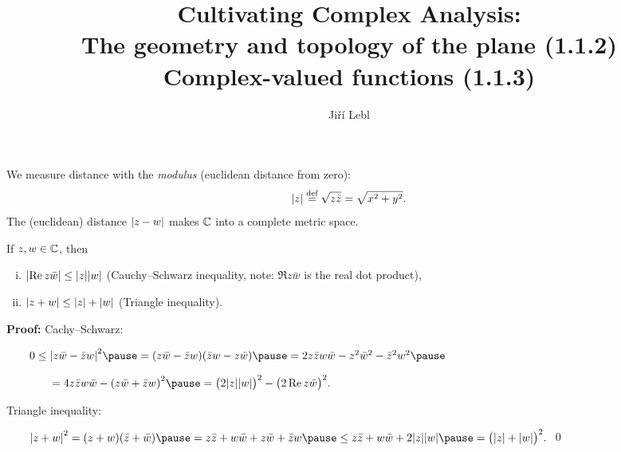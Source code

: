 \documentclass[10pt,aspectratio=169]{beamer}
\author{Ji\v{r}\'i Lebl}
\institute[OSU]{%
Departemento pri Matematiko de Oklahoma {\^S}tata Universitato}
\title{Cultivating Complex Analysis:\\%
The geometry and topology of the plane (1.1.2)\\%
Complex-valued functions (1.1.3)}
\date{}
\begin{document}
\begin{frame}
\titlepage
\end{frame}

\begin{frame}
We measure distance with the \emph{modulus} (euclidean distance from zero):
\[
\lvert {z} \rvert \overset{\text{def}}{=} \sqrt{z \bar{z}} = \sqrt{x^2+y^2} .
\]
\pause
The (euclidean) distance 
\(
\lvert {z-w} \rvert
\)
makes ${\mathbb{C}}$ into a complete metric space.

\medskip
\pause

%
%
%
%
\begin{proposition}
If $z,w \in {\mathbb{C}}$, then
\begin{enumerate}[(i)]
\item
$\lvert {\operatorname{Re}z\bar{w}} \rvert \leq \lvert {z} \rvert \lvert {w} \rvert$ \quad (Cauchy--Schwarz inequality, note: $\Re z
\bar{w}$ is the real dot product),
\item
$\lvert {z+w} \rvert \leq \lvert {z} \rvert + \lvert {w} \rvert$ \quad (Triangle inequality).
\end{enumerate}
\end{proposition}

\textbf{Proof:}
Cachy--Schwarz:

\medskip

\(
\qquad
0  \leq {\sabs{z\bar{w}-\bar{z}w}}^2 \pause
   =    (z\bar{w}-\bar{z}w)(\bar{z}w-z\bar{w})  \pause
   =    2z\bar{z}w\bar{w} - z^2\bar{w}^2 - \bar{z}^2w^2 \pause
\)

\( \qquad \qquad
   =    4z\bar{z}w\bar{w} - {(z\bar{w}+\bar{z}w)}^2 \pause
   =    {\bigl(2\sabs{z}\sabs{w}\bigr)}^2 - {\bigl(2 \Re z\bar{w}\bigr)}^2 .
\)

\medskip
\pause

Triangle inequality:

\medskip
\(
\qquad
{\sabs{z+w}}^2  =    (z+w)(\bar{z}+\bar{w}) \pause
                =    z\bar{z} + w\bar{w} + z\bar{w} + \bar{z}w \pause
                \leq z\bar{z} + w\bar{w} + 2 \sabs{z}\sabs{w} \pause
                =    {\bigl(\sabs{z}+\sabs{w}\bigr)}^2 .
\) \qed

\end{frame}
\end{document}
